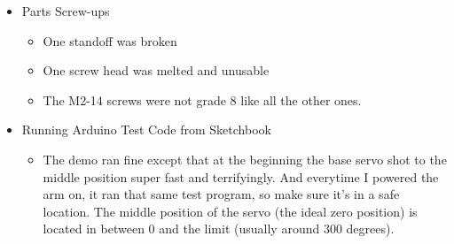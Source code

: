 \documentclass[letterpaper, 10 pt]{report}
\begin{document}
\begin{itemize}
  \item Parts Screw-ups
    \begin{itemize}
      \item One standoff was broken
      \item One screw head was melted and unusable
      \item The M2-14 screws were not grade 8 like all the other ones.
    \end{itemize}
  \item Running Arduino Test Code from Sketchbook
    \begin{itemize}
      \item The demo ran fine except that at the beginning the base servo shot to the middle position super fast and terrifyingly. And everytime I powered the arm on, it ran that same test program, so make sure it's in a safe location. The middle position of the servo (the ideal zero position) is located in between 0 and the limit (usually around 300 degrees).
    \end{itemize}
\end{itemize}


%

\end{document}
